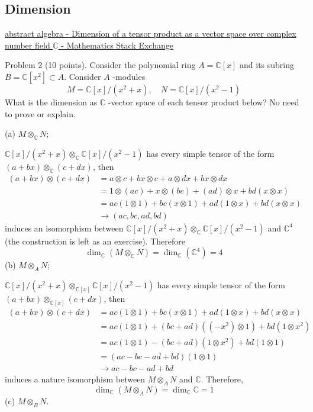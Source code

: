 \subsection{Dimension}

\href{https://math.stackexchange.com/questions/4306709/dimension-of-a-tensor-product-as-a-vector-space-over-complex-number-field-math}{abstract algebra - Dimension of a tensor product as a vector space over complex number field $\mathbb{C}$ - Mathematics Stack Exchange}

\begin{exercise}
Problem 2 (10 points). Consider the polynomial ring $A=\mathbb{C}[x]$ and its subring $B=\mathbb{C}\left[x^2\right] \subset A$.
Consider $A$ -modules
\[
M=\mathbb{C}[x] /\left(x^2+x\right), \quad N=\mathbb{C}[x] /\left(x^2-1\right)
\]What is the dimension as $\mathbb{C}$ -vector space of each tensor product below? No need to prove or explain.
\end{exercise}
(a) $M \otimes_{\mathbb{C}} N$;

$\mathbb{C}[x]/(x^2+x)\otimes_{\mathbb{C}}\mathbb{C}[x]/(x^2-1)$ has every simple tensor of the form $(a+bx)\otimes_{\mathbb{C}}(c+dx )$, then
\[
\begin{aligned}
(a+bx)\otimes (c+dx ) & =a\otimes c+bx\otimes c+a\otimes dx+bx\otimes dx \\
 & =1\otimes (ac)+x\otimes (bc)+(ad)\otimes x+bd(x\otimes x) \\
 & =ac(1\otimes 1)+bc(x\otimes 1)+ad(1\otimes x)+bd(x\otimes x) \\
 & \to(ac,bc,ad,bd)
\end{aligned}
\]
induces an isomorphism between $\mathbb{C}[x]/(x^2+x)\otimes_{\mathbb{C}}\mathbb{C}[x]/(x^2-1)$ and $\mathbb{C}^{4}$ (the construction is left as an exercise). Therefore
\[
\dim _{\mathbb{C}}(M\otimes _{\mathbb{C}}N)=\dim _{\mathbb{C}}(\mathbb{C}^{4})=4
\]
(b) $M \otimes_A N$;

$\mathbb{C}[x]/(x^2+x)\otimes_{\mathbb{C}[x]}\mathbb{C}[x]/(x^2-1)$ has every simple tensor of the form $(a+bx)\otimes_{\mathbb{C}[x]}(c+dx )$, then
\[
\begin{aligned}
(a+bx)\otimes (c+dx ) & =ac(1\otimes 1)+bc(x\otimes 1)+ad(1\otimes x)+bd(x\otimes x) \\
 & =ac(1\otimes 1)+(bc+ad)((-x^2)\otimes 1)+bd(1\otimes x^2) \\
 & =ac(1\otimes 1)-(bc+ad)(1\otimes x^2)+bd(1\otimes 1) \\
 & =(ac-bc-ad+bd)(1\otimes 1) \\
 & \to ac-bc-ad+bd
\end{aligned}
\]
induces a nature isomorphism between $M\otimes_{A}N$ and $\mathbb{C}$. Therefore,
\[
\dim _{\mathbb{C}}(M\otimes _{A}N)=\dim _{\mathbb{C}}\mathbb{C}=1
\]
(c) $M \otimes_B N$.

